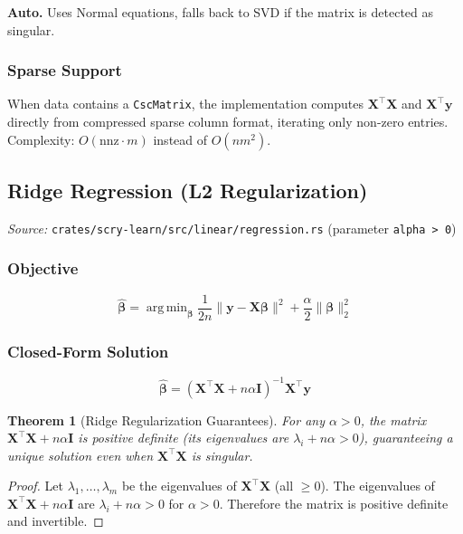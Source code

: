 \documentclass[11pt,a4paper]{article}
\newtheorem{theorem}{Theorem}[section]
\theoremstyle{definition}
\theoremstyle{remark}
\DeclareMathOperator*{\argmin}{arg\,min}
\begin{document}
\textbf{Auto.} Uses Normal equations, falls back to SVD if the matrix is detected as singular.

\subsubsection*{Sparse Support}

When data contains a \texttt{CscMatrix}, the implementation computes $\mathbf{X}^\top\mathbf{X}$ and $\mathbf{X}^\top\mathbf{y}$ directly from compressed sparse column format, iterating only non-zero entries. Complexity: $O(\mathrm{nnz} \cdot m)$ instead of $O(nm^2)$.

\subsection{Ridge Regression (L2 Regularization)}
\label{sec:ridge}

\noindent\textit{Source:} \texttt{crates/scry-learn/src/linear/regression.rs} (parameter \texttt{alpha > 0})

\subsubsection*{Objective}
\begin{equation}
\hat{\boldsymbol{\beta}} = \argmin_{\boldsymbol{\beta}} \frac{1}{2n}\|\mathbf{y} - \mathbf{X}\boldsymbol{\beta}\|^2 + \frac{\alpha}{2}\|\boldsymbol{\beta}\|_2^2
\end{equation}

\subsubsection*{Closed-Form Solution}
\begin{equation}
\hat{\boldsymbol{\beta}} = (\mathbf{X}^\top\mathbf{X} + n\alpha\mathbf{I})^{-1}\mathbf{X}^\top\mathbf{y}
\end{equation}

\begin{theorem}[Ridge Regularization Guarantees]
For any $\alpha > 0$, the matrix $\mathbf{X}^\top\mathbf{X} + n\alpha\mathbf{I}$ is positive definite (its eigenvalues are $\lambda_i + n\alpha > 0$), guaranteeing a unique solution even when $\mathbf{X}^\top\mathbf{X}$ is singular.
\end{theorem}

\begin{proof}
Let $\lambda_1, \ldots, \lambda_m$ be the eigenvalues of $\mathbf{X}^\top\mathbf{X}$ (all $\geq 0$). The eigenvalues of $\mathbf{X}^\top\mathbf{X} + n\alpha\mathbf{I}$ are $\lambda_i + n\alpha > 0$ for $\alpha > 0$. Therefore the matrix is positive definite and invertible.
\end{proof}
\end{document}
